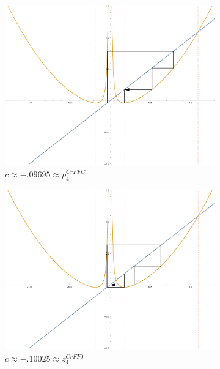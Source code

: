 \begin{figure}[ht]
		\begin{subfigure}[b]{0.3\textwidth}
				\includegraphics[width=\textwidth]{./img/plot-009695}
				\caption{$c \approx -.09695 \approx p_4^{CrFFC}$}
		\end{subfigure}
		\begin{subfigure}[b]{0.3\textwidth}
				\includegraphics[width=\textwidth]{./img/plot-010025}
				\caption{$c \approx -.10025 \approx z_4^{CrFF0}$}
		\end{subfigure}
		\begin{subfigure}[b]{0.3\textwidth}

\end{subfigure}
\end{figure}
